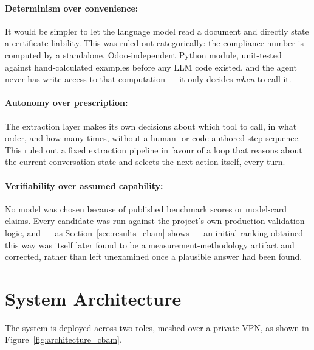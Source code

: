 \paragraph{Determinism over convenience:} It would be simpler to let the
language model read a document and directly state a certificate liability.
This was ruled out categorically: the compliance number is computed by a
standalone, Odoo-independent Python module, unit-tested against
hand-calculated examples before any LLM code existed, and the agent never
has write access to that computation --- it only decides \textit{when} to
call it.

\paragraph{Autonomy over prescription:} The extraction layer makes its own
decisions about which tool to call, in what order, and how many times,
without a human- or code-authored step sequence. This ruled out a fixed
extraction pipeline in favour of a loop that reasons about the current
conversation state and selects the next action itself, every turn.

\paragraph{Verifiability over assumed capability:} No model was chosen
because of published benchmark scores or model-card claims. Every
candidate was run against the project's own production validation logic,
and --- as Section~\ref{sec:results_cbam} shows --- an initial ranking
obtained this way was itself later found to be a measurement-methodology
artifact and corrected, rather than left unexamined once a plausible
answer had been found.

\section{System Architecture}
\label{sec:architecture_cbam}

The system is deployed across two roles, meshed over a private VPN, as
shown in Figure~\ref{fig:architecture_cbam}.

